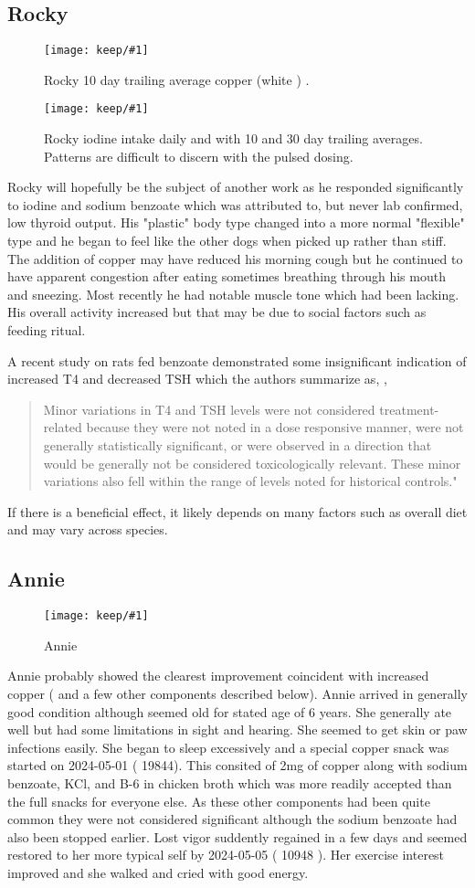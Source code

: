 \documentclass[aps,secnumarabic,balancelastpage,amsmath,amssymb,nofootinbib]{revtex4}
\newlength{\fullfigwidth}  \setlength{\fullfigwidth}{.8\textwidth }
\newcommand{\mjmfullplot}[1]{\texttt{[image: keep/\#1]}}
\newcommand{\mjmrockycu}{
\begin{figure}[htb] 
\centering
\mjmfullplot{rocky_cu.jpg}
\caption{    Rocky 10 day trailing average copper (white )
. 
  }
\end{figure}
} %
\newcommand{\mjmrockyi}{
\begin{figure}[htb] 
\centering
\mjmfullplot{rocky_i.jpg}
\caption{    Rocky iodine intake daily and with 10 and 30 day trailing averages. Patterns are difficult to discern with the pulsed dosing.  
  }
\end{figure}
} %
\newcommand{\mjmanniecu}{
\begin{figure}[htb] 
\centering
\mjmfullplot{annie_cu.jpg}
\caption{    Annie  
  }
\end{figure}
} %
\begin{document}
\subsection{Rocky}

\mjmrockycu

\mjmrockyi

Rocky will hopefully be the subject of another work as
he responded significantly to iodine and sodium benzoate
which was attributed to, but never lab confirmed, low
thyroid output. His "plastic" body type changed into
a more normal "flexible" type and he began to feel like 
the other dogs when picked up rather than stiff.
The addition of copper may have reduced his morning cough
but he continued to have apparent congestion after eating
sometimes breathing through his mouth and sneezing.
Most recently he had notable muscle tone which had been lacking.
His overall activity increased but that may be due to social factors
such as feeding ritual. 


A recent study on rats fed benzoate demonstrated
some insignificant indication of increased T4 and decreased
TSH which the authors summarize as,
\cite{TURNBULL2021104897}
,
\begin{quote}
Minor variations in T4 and TSH levels were not considered treatment-related because they were not noted in a dose responsive manner, were not generally statistically significant, or were observed in a direction that would be generally not be considered toxicologically relevant. These minor variations also fell within the range of levels noted for historical controls."
\end{quote}

If there is a beneficial effect, it likely depends on many factors
such as overall diet and may vary across species.





\subsection{Annie}

\mjmanniecu

Annie probably showed the clearest improvement
coincident with increased copper ( and a few other components
described below). 
Annie arrived in generally good condition although 
seemed old for stated age of 6 years. She generally ate well
but had some limitations in sight and hearing. She
seemed to get skin or paw infections easily.
She began to sleep excessively 
and a  special copper snack was started on 2024-05-01 ( 19844).
This consited of 2mg of copper along with sodium benzoate, KCl,
and B-6 in chicken broth which was more readily accepted than the 
full snacks for everyone else. 
As these other components had been quite common they were not
considered significant although the sodium benzoate had also been 
stopped earlier. 
Lost vigor suddently regained in a few days
and seemed restored to her more typical self by
 2024-05-05 ( 10948 ).
Her exercise interest improved and she walked and cried
with good energy. 
\end{document}
